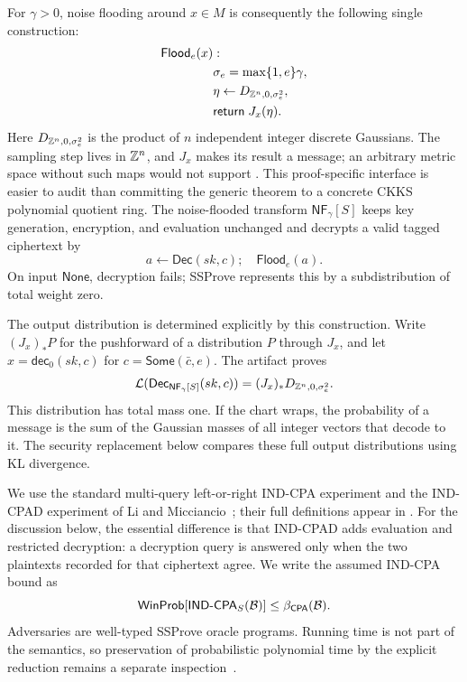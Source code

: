 For \(\gamma>0\), noise flooding around \(x\in M\) is consequently the
following single construction:
\begin{equation}
\label{eq:flood}
\begin{aligned}
 \mathsf{Flood}_e(x)&:\\
 &\sigma_e=\max\{1,e\}\gamma,\\
 &\eta\leftarrow D_{\mathbb{Z}^n,0,\sigma_e^2},\\
 &\mathsf{return}\;J_x(\eta).
\end{aligned}
\end{equation}
Here \(D_{\mathbb{Z}^n,0,\sigma_e^2}\) is the product of \(n\) independent
integer discrete Gaussians.
The sampling step lives in \(\mathbb{Z}^n\), and \(J_x\) makes its result a message;
an arbitrary metric space without such maps would not support
.
This proof-specific interface is easier to audit than committing the generic
theorem to a concrete CKKS polynomial quotient ring.
The noise-flooded transform \(\mathsf{NF}_{\gamma}[S]\) keeps key generation,
encryption, and evaluation unchanged and decrypts a valid tagged ciphertext by
\[
 a\leftarrow\mathsf{Dec}(sk,c);
 \quad \mathsf{Flood}_e(a).
\]
On input \(\mathsf{None}\), decryption fails; SSProve represents this by a
subdistribution of total weight zero.

The output distribution is determined explicitly by this construction.
Write \((J_x)_*P\) for the pushforward of a distribution \(P\) through
\(J_x\), and let \(x=\mathsf{dec}_0(sk,c)\) for
\(c=\mathsf{Some}(\bar c,e)\).
The artifact proves
\begin{equation}
\label{eq:flood-output-distribution}
 \mathcal{L}(\mathsf{Dec}_{\mathsf{NF}_{\gamma}[S]}(sk,c))
   =(J_x)_*D_{\mathbb{Z}^n,0,\sigma_e^2}.
\end{equation}
This distribution has total mass one.
If the chart wraps, the probability of a message is the sum of the Gaussian
masses of all integer vectors that decode to it.
The security replacement below compares these full output distributions
using KL divergence.

We use the standard multi-query left-or-right IND-CPA experiment and the
IND-CPAD experiment of Li and Micciancio~\cite{lm}; their full definitions
appear in .
For the discussion below, the essential difference is that IND-CPAD adds
evaluation and restricted decryption: a decryption query is answered only
when the two plaintexts recorded for that ciphertext agree.
We write the assumed IND-CPA bound as
\[
 \mathsf{WinProb}[\mathsf{IND\text{-}CPA}_{S}(\mathcal{B})]
 \leq \beta_{\mathsf{CPA}}(\mathcal{B}).
\]
Adversaries are well-typed SSProve oracle programs.  Running time is not part
of the semantics, so preservation of probabilistic polynomial time by the
explicit reduction remains a separate inspection~\cite{ssprove}.

